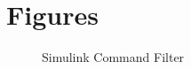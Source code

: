 

\section{Figures}
\begin{figure}[h!]
	\centering
	\caption{Simulink Command Filter\label{fig:app.CF}}
\end{figure}		

%
%

%
%        

%
%
